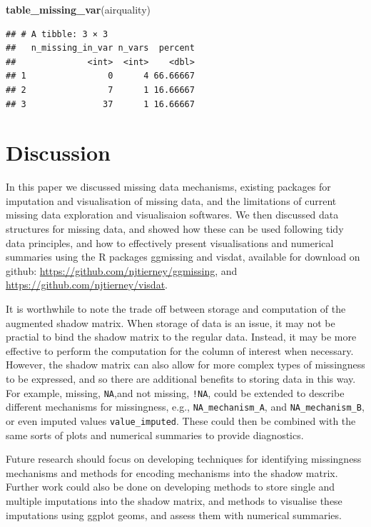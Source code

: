 \documentclass[]{article}
\newenvironment{Shaded}{\begin{snugshade}}{\end{snugshade}}
\newcommand{\KeywordTok}[1]{\textcolor[rgb]{0.13,0.29,0.53}{\textbf{{#1}}}}
\newcommand{\NormalTok}[1]{{#1}}
\begin{document}
\begin{Shaded}
\begin{Highlighting}[]
\KeywordTok{table_missing_var}\NormalTok{(airquality)}
\end{Highlighting}
\end{Shaded}

\begin{verbatim}
## # A tibble: 3 × 3
##   n_missing_in_var n_vars  percent
##              <int>  <int>    <dbl>
## 1                0      4 66.66667
## 2                7      1 16.66667
## 3               37      1 16.66667
\end{verbatim}

\section{Discussion}\label{discussion}

In this paper we discussed missing data mechanisms, existing packages
for imputation and visualisation of missing data, and the limitations of
current missing data exploration and visualisaion softwares. We then
discussed data structures for missing data, and showed how these can be
used following tidy data principles, and how to effectively present
visualisations and numerical summaries using the R packages ggmissing
and visdat, available for download on github:
\url{https://github.com/njtierney/ggmissing}, and
\url{https://github.com/njtierney/visdat}.

It is worthwhile to note the trade off between storage and computation
of the augmented shadow matrix. When storage of data is an issue, it may
not be practial to bind the shadow matrix to the regular data. Instead,
it may be more effective to perform the computation for the column of
interest when necessary. However, the shadow matrix can also allow for
more complex types of missingness to be expressed, and so there are
additional benefits to storing data in this way. For example, missing,
\texttt{NA},and not missing, \texttt{!NA}, could be extended to describe
different mechanisms for missingness, e.g., \texttt{NA\_mechanism\_A},
and \texttt{NA\_mechanism\_B}, or even imputed values
\texttt{value\_imputed}. These could then be combined with the same
sorts of plots and numerical summaries to provide diagnostics.

Future research should focus on developing techniques for identifying
missingness mechanisms and methods for encoding mechanisms into the
shadow matrix. Further work could also be done on developing methods to
store single and multiple imputations into the shadow matrix, and
methods to visualise these imputations using ggplot geoms, and assess
them with numerical summaries.
\end{document}
